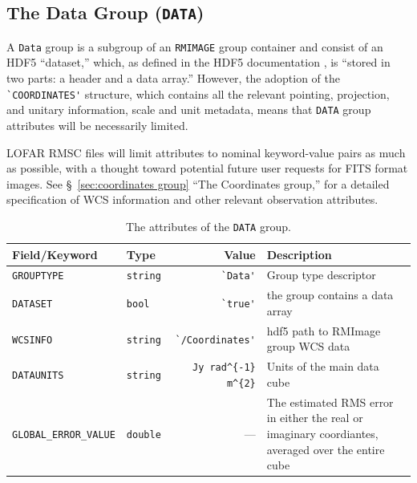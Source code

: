 \documentclass[a4paper,10pt,bibtotoc]{scrartcl}
\begin{document}

\subsection{The Data Group ({\tt DATA})}

A \texttt{Data} group is a subgroup of an \texttt{RMIMAGE} group  container and consist of an HDF5 ``dataset,'' which, as defined in the HDF5 documentation \cite{hdf5,hdf5.ug,hdf5.rm}, is ``stored in two parts: a header and a data array.''  However, the adoption of the \verb|`COORDINATES'| structure, which contains all the relevant pointing, projection, and unitary information, scale and unit metadata,  means that \texttt{DATA} group attributes will be necessarily limited. 

LOFAR RMSC files will limit attributes to nominal keyword-value pairs as much as possible, with a thought toward potential future user requests for FITS format images.  See \S\ \ref{sec:coordinates group} ``The Coordinates group,'' for a detailed specification of WCS information and other relevant observation attributes.

\begin{table}[ht]
  \centering
  \begin{tabular}{|llrp{7cm}|}
    \hline
    \sc Field/Keyword & \sc Type & \sc Value & \sc Description \\
    \hline \hline
        \small{\verb|GROUPTYPE|} & \verb|string| & \verb|`Data'|& Group type descriptor \\
        \small{\verb|DATASET|}   & \verb|bool|   & \verb|`true'| & the group contains a data array \\
        \small{\verb|WCSINFO|}   & \verb|string| &\verb|`/Coordinates'| & hdf5 path to RMImage group WCS data \\
        \small{\verb|DATAUNITS|} & \verb|string| & \verb|Jy rad^{-1} m^{2}| & Units of the main data cube \\
        \small{\verb|GLOBAL_ERROR_VALUE|} & \small\verb|double| & --- & The estimated RMS error in either the real or imaginary coordiantes, averaged over the entire cube \\
    \hline
  \end{tabular}
  \caption{The attributes of the \texttt{DATA} group.}
  \label{tab:data_group}
\end{table}
\end{document}
